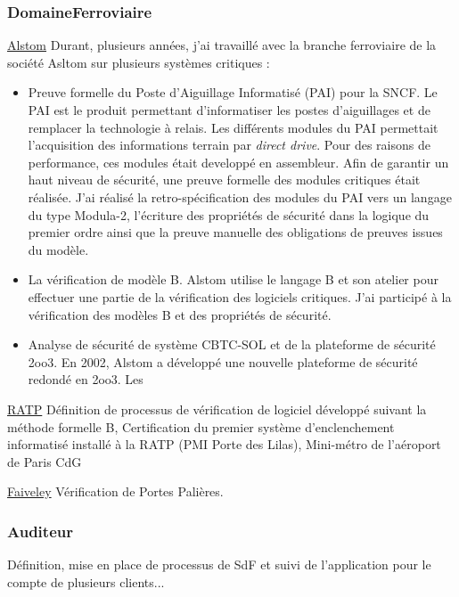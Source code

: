 \documentclass[a4paper,12pt]{article}
\newcommand{\smallspace}{\vspace{0.25cm}}
\begin{document}
\subsubsection{DomaineFerroviaire}
\hspace{-0.6cm}\underline{Alstom} Durant, plusieurs ann\'ees, j'ai
travaill\'e avec la branche ferroviaire de la soci\'et\'e Asltom sur
plusieurs syst\`emes critiques :
\begin{itemize}
  \item Preuve formelle du Poste d'Aiguillage Informatis\'e (PAI) pour la
    SNCF. Le PAI est le produit permettant d'informatiser les postes
    d'aiguillages et de remplacer la technologie \`a relais. Les
    diff\'erents modules du PAI permettait l'acquisition des
    informations terrain par \emph{direct drive}. Pour des raisons de
    performance, ces modules \'etait developp\'e en assembleur. Afin
    de garantir un haut niveau de s\'ecurit\'e, une preuve formelle
    des modules critiques \'etait r\'ealis\'ee. J'ai r\'ealis\'e la
    retro-sp\'ecification des modules du PAI vers un langage du type
    Modula-2, l'\'ecriture des propri\'et\'es de s\'ecurit\'e dans la
    logique du premier ordre ainsi que la preuve manuelle des obligations de
    preuves issues du mod\`ele.
  \item La v\'erification de mod\`ele B. Alstom utilise le langage B
    et son atelier pour effectuer une partie de la v\'erification des
    logiciels critiques. J'ai particip\'e \`a la v\'erification des
    mod\`eles B et des propri\'et\'es de s\'ecurit\'e.
  \item Analyse de s\'ecurit\'e de syst\`eme CBTC-SOL et de la
    plateforme de s\'ecurit\'e 2oo3. En 2002, Alstom a d\'evelopp\'e
    une nouvelle plateforme de s\'ecurit\'e redond\'e en 2oo3. Les 
\end{itemize}

\smallspace
\hspace{-0.6cm}\underline{RATP}
  D\'efinition de processus de v\'erification de logiciel
  d\'evelopp\'e suivant la m\'ethode formelle B, Certification du
  premier syst\`eme d'enclenchement informatis\'e  install\'e \`a  la RATP (PMI Porte des Lilas),
  Mini-m\'etro de l'a\'eroport de Paris CdG

\smallspace
\hspace{-0.6cm}\underline{Faiveley} V\'erification de Portes Pali\`eres.  


\subsubsection {Auditeur}
D\'efinition, mise en place de processus de SdF et suivi de
l'application pour le compte de plusieurs clients... 
\end{document}
